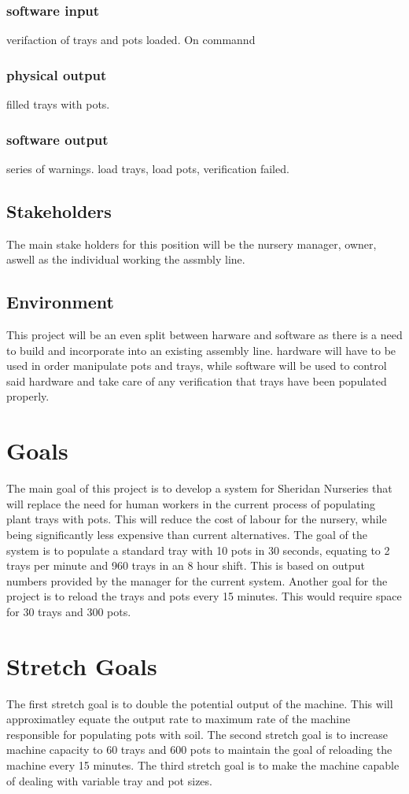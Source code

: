\documentclass{article}
\begin{document}
\subsubsection{software input}
verifaction of trays and pots loaded. On commannd
\subsubsection{physical output}
filled trays with pots.
\subsubsection{software output}
series of warnings. load trays, load pots, verification failed.


\subsection{Stakeholders}
The main stake holders for this position will be the nursery manager, owner, aswell as the individual working the assmbly line.

\subsection{Environment}
This project will be an even split between harware and software as there is a need to build and incorporate into an existing assembly line.
hardware will have to be used in order manipulate pots and trays, while software will be used to control said hardware 
and take care of any verification that trays have been populated properly.
\section{Goals}
The main goal of this project is to develop a system for Sheridan Nurseries
that will replace the need for human workers in the current process of populating plant trays with pots. This will reduce the cost
of labour for the nursery, while being significantly less expensive than current alternatives. The goal of the system is to populate 
a standard tray with 10 pots in 30 seconds, equating to 2 trays per minute and 960 trays in an 8 hour shift. This is based on output 
numbers provided by the manager for the current system. Another goal for the project is to reload the trays and pots every 15 minutes.
This would require space for 30 trays and 300 pots.


\section{Stretch Goals}
The first stretch goal is to double the potential output of the machine. This will approximatley equate the output rate to maximum rate of the
machine responsible for populating pots with soil. The second stretch goal is to increase machine capacity to 60 trays and 600 pots to
maintain the goal of reloading the machine every 15 minutes. The third stretch goal is to make the machine capable of dealing with variable
tray and pot sizes.
\end{document}

